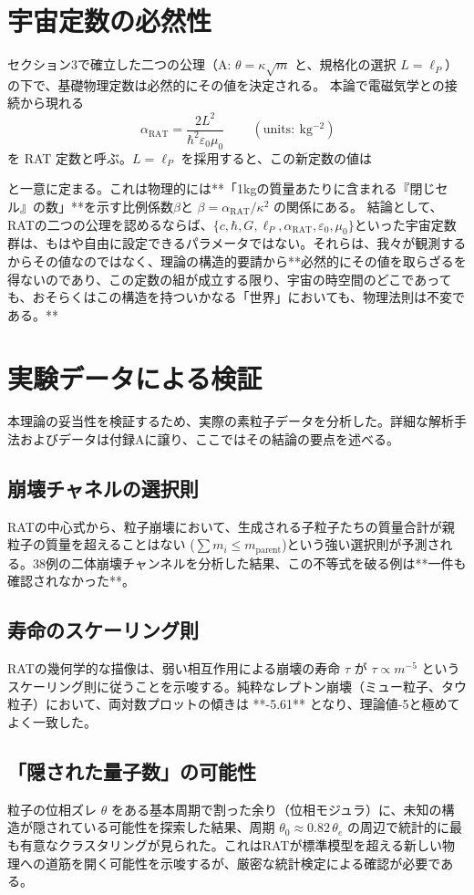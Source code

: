 \documentclass[11pt,a4paper,ja=standard]{ltjarticle}
\newcommand{\rat}{\mathrm{RAT}}
\newcommand{\lp}{\ell_P}
\newcommand{\ar}{\alpha_{\rat}}
\newcommand{\kappaR}{\kappa}
\newcommand{\betaC}{\beta}
\begin{document}
\section{宇宙定数の必然性}
セクション3で確立した二つの公理（A: $\theta=\kappaR\sqrt{m}$ と、規格化の選択 $L=\ell_P$）の下で、基礎物理定数は必然的にその値を決定される。
本論で電磁気学との接続から現れる
\[ \boxed{\,\ar = \frac{2 L^2}{\hbar^2 \varepsilon_0 \mu_0}\,}\qquad(\mathrm{units:\ kg^{-2}}) \]
を RAT 定数と呼ぶ。$L=\ell_P$ を採用すると、この新定数の値は
\begin{center}
    \fbox{\parbox{0.9\textwidth}{\centering \textbf{$\ar = 4.222200526682808 \times 10^{15}\ \mathrm{kg^{-2}}$}}}
\end{center}
と一意に定まる。これは物理的には**「1kgの質量あたりに含まれる『閉じセル』の数」**を示す比例係数$\betaC$と $\betaC=\ar/\kappaR^2$ の関係にある。
結論として、RATの二つの公理を認めるならば、$\{ c, \hbar, G, \lp, \ar, \varepsilon_0, \mu_0 \}$といった宇宙定数群は、もはや自由に設定できるパラメータではない。それらは、我々が観測するからその値なのではなく、理論の構造的要請から**必然的にその値を取らざるを得ないのであり、この定数の組が成立する限り、宇宙の時空間のどこであっても、おそらくはこの構造を持ついかなる「世界」においても、物理法則は不変である。**

\section{実験データによる検証}
本理論の妥当性を検証するため、実際の素粒子データを分析した。詳細な解析手法およびデータは付録Aに譲り、ここではその結論の要点を述べる。
\subsection{崩壊チャネルの選択則}
RATの中心式から、粒子崩壊において、生成される子粒子たちの質量合計が親粒子の質量を超えることはない ($\sum m_i \le m_{\text{parent}}$)という強い選択則が予測される。38例の二体崩壊チャンネルを分析した結果、この不等式を破る例は**一件も確認されなかった**。
\subsection{寿命のスケーリング則}
RATの幾何学的な描像は、弱い相互作用による崩壊の寿命 $\tau$ が $\tau \propto m^{-5}$ というスケーリング則に従うことを示唆する。純粋なレプトン崩壊（ミュー粒子、タウ粒子）において、両対数プロットの傾きは **-5.61** となり、理論値-5と極めてよく一致した。
\subsection{「隠された量子数」の可能性}
粒子の位相ズレ $\theta$ をある基本周期で割った余り（位相モジュラ）に、未知の構造が隠されている可能性を探索した結果、周期 $\theta_0 \approx 0.82\,\theta_e$ の周辺で統計的に最も有意なクラスタリングが見られた。これはRATが標準模型を超える新しい物理への道筋を開く可能性を示唆するが、厳密な統計検定による確認が必要である。
\end{document}
